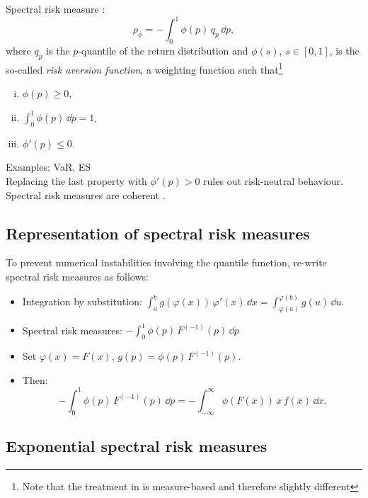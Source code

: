 \documentclass[square]{article} %
\theoremstyle{plain}
\theoremstyle{definition} %
\begin{document}
Spectral risk measure \citep{Acerbi2002,Cotter2006}:
\begin{equation*}
\rho_\phi = -\int_0^1 \phi(p)\, q_p\, \dd p,
\end{equation*}
where $q_p$ is the $p$-quantile of the return distribution and
$\phi(s)$, $s\in [0,1]$, is the so-called {\em risk aversion
  function\/}, a weighting function such that\footnote{Note that the
  treatment in \citep{Acerbi2002} is measure-based and therefore
  slightly different} 
\begin{enumerate}[(i)]
\item $\phi(p)\geq 0$,
\item $\int_0^1\phi(p)\, \dd p=1$,
\item $\phi'(p)\leq 0$. 
\end{enumerate}
Examples: VaR, ES\\
Replacing the last property with $\phi'(p)>0$ rules out risk-neutral
behaviour. \\
Spectral risk measures are coherent \citep{Acerbi2002}. 

\subsection{Representation of spectral risk measures}
\label{sec:repr-spectr-risk}

To prevent numerical instabilities involving the quantile function,
re-write spectral risk measures as follows:
\begin{itemize}
\item Integration by substitution: $\displaystyle \int_a^b
  g(\varphi(x)) \,\varphi'(x)\, \dd x = \int_{\varphi(a)}^{\varphi(b)}
  g(u)\, \dd u$.
\item Spectral risk measures: $\displaystyle -\int_0^1 \phi(p) \,
  F^{(-1)}(p)\, \dd p$
\item Set $\varphi(x)=F(x)$, $g(p) = \phi(p)\, F^{(-1)}(p)$.
\item Then:
  \begin{equation*}
    -\int_0^1 \phi(p)\, F^{(-1)}(p)\, \dd p = -\int_{-\infty}^\infty
    \phi(F(x))\, x\, f(x)\, \dd x.
  \end{equation*}
\end{itemize}


\subsection{Exponential spectral risk measures}
\label{sec:expon-risk-meas}
\end{document}
